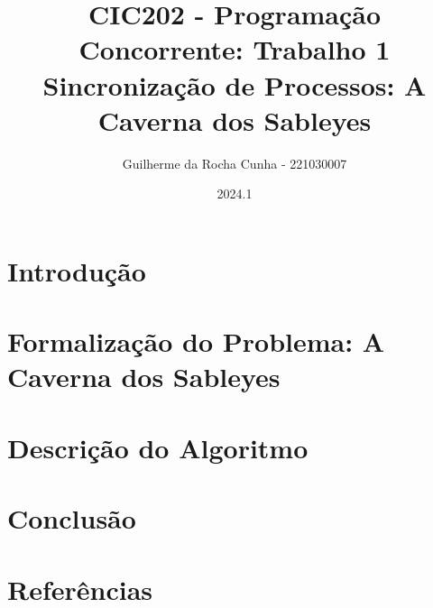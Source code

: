 \documentclass{article}
\title{CIC202 - Programação Concorrente: Trabalho 1 \\
        \large \textbf{Sincronização de Processos:} A Caverna dos Sableyes}
\author{Guilherme da Rocha Cunha - 221030007}
\date{2024.1}
\begin{document}
\pagestyle{fancy}

\maketitle

\newpage

\fancyhead{}
\fancyfoot[C]{\thepage}


\renewcommand*\contentsname{Sumário}
\tableofcontents

\newpage

\section{Introdução}

\section{Formalização do Problema: A Caverna dos Sableyes}

\section{Descrição do Algoritmo}

\section{Conclusão}

\section{Referências}
\end{document}
